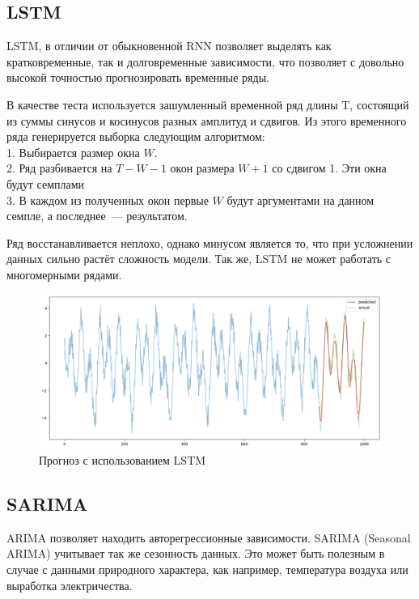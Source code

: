 \documentclass{article}
\begin{document}
\subsection{LSTM}

LSTM, в отличии от обыкновенной RNN позволяет выделять как кратковременные, так и долговременные зависимости, что позволяет с довольно высокой точностью прогнозировать временные ряды.

В качестве теста используется зашумленный временной ряд длины T, состоящий из суммы синусов и косинусов разных амплитуд и сдвигов. Из этого временного ряда генерируется выборка следующим алгоритмом:\\
1. Выбирается размер окна $W$.\\
2. Ряд разбивается на $T-W-1$ окон размера $W+1$ со сдвигом 1. Эти окна будут семплами\\
3. В каждом из полученных окон первые $W$ будут аргументами на данном семпле, а последнее~--- результатом.

Ряд восстанавливается неплохо, однако минусом является то, что при усложнении данных сильно растёт сложность модели. Так же, LSTM не может работать с многомерными рядами.

\begin{figure}[H]
	\centering
	\includegraphics[width=\textwidth]{LSTM-prediction.png}
	\caption{Прогноз с использованием LSTM}
	\label{fig:fig1}
\end{figure}

\subsection{SARIMA}

ARIMA позволяет находить авторегрессионные зависимости. SARIMA (Seasonal ARIMA) учитывает так же сезонность данных. Это может быть полезным в случае с данными природного характера, как например, температура воздуха или выработка электричества.
\end{document}
